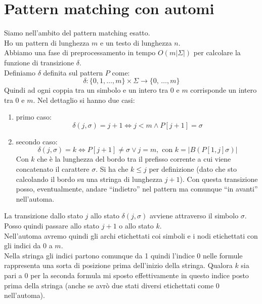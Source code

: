 \section{Pattern matching con automi}
Siamo nell'ambito del pattern matching esatto.\\
Ho un pattern di lunghezza $m$ e un testo di lunghezza $n$.\\
Abbiamo una fase di preprocessamento in tempo $O(m|\Sigma|)$ per calcolare la
funzione di transizione $\delta$.\\
Definiamo $\delta$ definita sul pattern $P$ come:
\[\delta:\{0,1,\ldots, m\}\times \Sigma\to\{0,\,\ldots, m\}\]
Quindi ad ogni coppia tra un simbolo e un intero tra 0 e $m$ corrisponde un
intero tra 0 e $m$. Nel dettaglio si hanno due casi:
\begin{enumerate}
  \item primo caso:
  \[\delta(j,\sigma)=j+1\iff j<m\land P[j+1]=\sigma\]

  \item secondo caso:
  \[\delta(j,\sigma)=k\iff P[j+1]\neq \sigma \lor j=m,\mbox{ con
    }k=|B(P[1,j]\sigma)|\]
  Con $k$ che è la lunghezza del bordo tra il prefisso corrente a cui viene
  concatenato il carattere $\sigma$. Si ha che $k\leq j$ per definizione (dato
  che sto calcolando il bordo su una stringa di lunghezza $j+1$). Con questa 
  transizione posso, eventualmente, andare ``indietro'' nel pattern ma comunque
  ``in avanti'' nell'automa.
\end{enumerate}
La transizione dallo stato $j$ allo stato $\delta(j,\sigma)$ avviene attraverso
il simbolo $\sigma$. Posso quindi passare allo stato $j+1$ o allo stato $k$.\\
Nell'automa avremo quindi gli archi etichettati coi simboli e i nodi
etichettati con gli indici da 0 a $m$.\\
Nella stringa gli indici partono comunque da 1 quindi l'indice 0 nelle formule
rappresenta una sorta di posizione prima dell'inizio della stringa. Qualora $k$
sia pari a 0 per la seconda formula mi sposto effettivamente in questo indice
posto prima della stringa (anche se avrò due stati diversi etichettati come 0
nell'automa).
